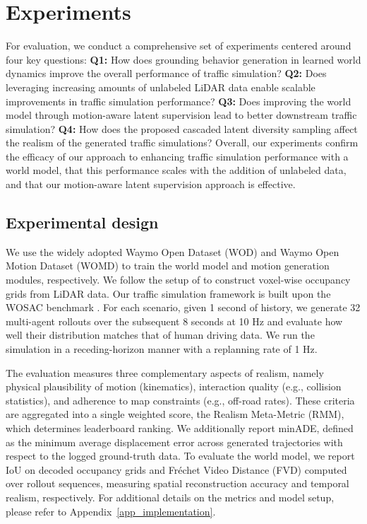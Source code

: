 \documentclass[runningheads]{llncs}
\begin{document}
\section{Experiments}
For evaluation, we conduct a comprehensive set of experiments centered around four key questions: \textbf{Q1:} How does grounding behavior generation in learned world dynamics improve the overall performance of traffic simulation? \textbf{Q2:} Does leveraging increasing amounts of unlabeled LiDAR data enable scalable improvements in traffic simulation performance? \textbf{Q3:} Does improving the world model through motion-aware latent supervision lead to better downstream traffic simulation? \textbf{Q4:} How does the proposed cascaded latent diversity sampling affect the realism of the generated traffic simulations? Overall, our experiments confirm the efficacy of our approach to enhancing traffic simulation performance with a world model, that this performance scales with the addition of unlabeled data, and that our motion-aware latent supervision approach is effective.

\vspace{-2mm}

\subsection{Experimental design}

We use the widely adopted Waymo Open Dataset (WOD) \cite{sun2020scalability} and Waymo Open Motion Dataset (WOMD) \cite{ettinger2021large} to train the world model and motion generation modules, respectively. We follow the setup of \cite{tian2023occ3d} to construct voxel-wise occupancy grids from LiDAR data. Our traffic simulation framework is built upon the WOSAC benchmark \cite{montali2023waymo}. For each scenario, given 1 second of history, we generate 32 multi-agent rollouts over the subsequent 8 seconds at 10 Hz and evaluate how well their distribution matches that of human driving data. We run the simulation in a receding-horizon manner with a replanning rate of 1 Hz.

The evaluation measures three complementary aspects of realism, namely physical plausibility of motion (kinematics), interaction quality (e.g., collision statistics), and adherence to map constraints (e.g., off-road rates). These criteria are aggregated into a single weighted score, the Realism Meta-Metric (RMM), which determines leaderboard ranking. We additionally report minADE, defined as the minimum average displacement error across generated trajectories with respect to the logged ground-truth data. To evaluate the world model, we report IoU on decoded occupancy grids and Fréchet Video Distance (FVD) computed over rollout sequences, measuring spatial reconstruction accuracy and temporal realism, respectively. For additional details on the metrics and model setup, please refer to Appendix~\ref{app_implementation}.
\end{document}
